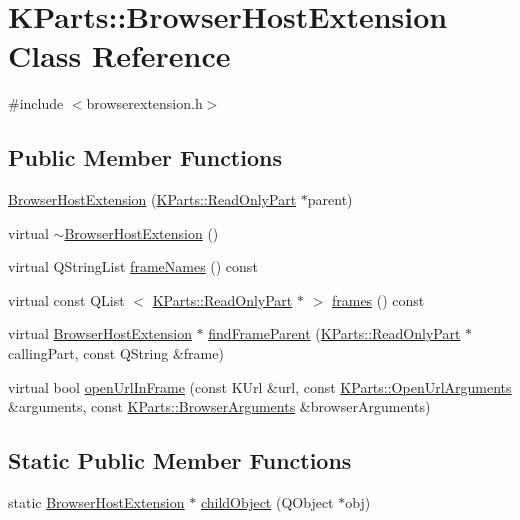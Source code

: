 \hypertarget{classKParts_1_1BrowserHostExtension}{\section{\-K\-Parts\-:\-:\-Browser\-Host\-Extension \-Class \-Reference}
\label{classKParts_1_1BrowserHostExtension}
}


{\ttfamily \#include $<$browserextension.\-h$>$}

\subsection*{\-Public \-Member \-Functions}
\begin{DoxyCompactItemize}
\item 
\hyperlink{classKParts_1_1BrowserHostExtension_af1c75309d63462007edd8536c0e57274}{\-Browser\-Host\-Extension} (\hyperlink{classKParts_1_1ReadOnlyPart}{\-K\-Parts\-::\-Read\-Only\-Part} $\ast$parent)
\item 
virtual \hyperlink{classKParts_1_1BrowserHostExtension_aa7202fb68e55dcf3556e0611c6b78263}{$\sim$\-Browser\-Host\-Extension} ()
\item 
virtual \-Q\-String\-List \hyperlink{classKParts_1_1BrowserHostExtension_a25ae4238d3c4f556ee9c7287c16c0f09}{frame\-Names} () const 
\item 
virtual const \-Q\-List\*
$<$ \hyperlink{classKParts_1_1ReadOnlyPart}{\-K\-Parts\-::\-Read\-Only\-Part} $\ast$ $>$ \hyperlink{classKParts_1_1BrowserHostExtension_a65a6429a794aa78ff5de27f973a43e86}{frames} () const 
\item 
virtual \hyperlink{classKParts_1_1BrowserHostExtension}{\-Browser\-Host\-Extension} $\ast$ \hyperlink{classKParts_1_1BrowserHostExtension_aa7d6192b9f6a399135f34d530d74a3e7}{find\-Frame\-Parent} (\hyperlink{classKParts_1_1ReadOnlyPart}{\-K\-Parts\-::\-Read\-Only\-Part} $\ast$calling\-Part, const \-Q\-String \&frame)
\item 
virtual bool \hyperlink{classKParts_1_1BrowserHostExtension_ae0227348d8b864d3093fb5dc6ca876f0}{open\-Url\-In\-Frame} (const \-K\-Url \&url, const \hyperlink{classKParts_1_1OpenUrlArguments}{\-K\-Parts\-::\-Open\-Url\-Arguments} \&arguments, const \hyperlink{structKParts_1_1BrowserArguments}{\-K\-Parts\-::\-Browser\-Arguments} \&browser\-Arguments)
\end{DoxyCompactItemize}
\subsection*{\-Static \-Public \-Member \-Functions}
\begin{DoxyCompactItemize}
\item 
static \hyperlink{classKParts_1_1BrowserHostExtension}{\-Browser\-Host\-Extension} $\ast$ \hyperlink{classKParts_1_1BrowserHostExtension_aa0a695c166742e7f49f65d8a2f3d5216}{child\-Object} (\-Q\-Object $\ast$obj)
\end{DoxyCompactItemize}


